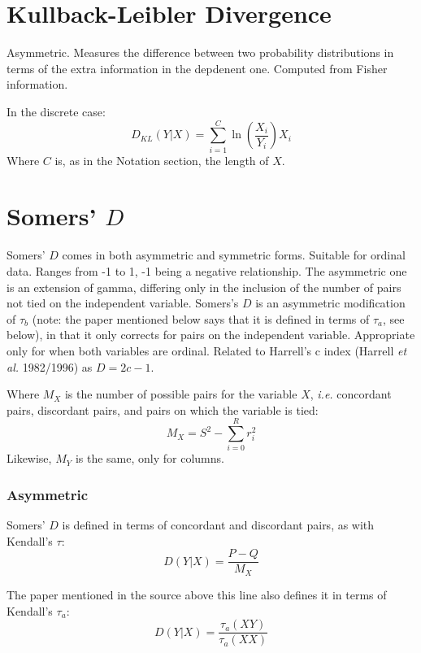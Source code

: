 \documentclass[11pt]{article}
\begin{document}
\section{Kullback-Leibler Divergence}
Asymmetric.  Measures the difference between two probability distributions in terms of the extra information in the depdenent one.  Computed from Fisher information.  

In the discrete case:
$$
D_{KL}(Y|X) = \sum_{i=1}^{C}{ \ln \left( \frac{X_i}{Y_i} \right) } X_i
$$
Where $C$ is, as in the Notation section, the length of $X$.



\section{Somers' $D$}
Somers' $D$ comes in both asymmetric and symmetric forms.  Suitable for ordinal data.  Ranges from -1 to 1, -1 being a negative relationship.  The asymmetric one is an extension of gamma, differing only in the inclusion of the number of pairs not tied on the independent variable.  Somers's $D$ is an asymmetric modification of $\tau_b$ (note: the paper mentioned below says that it is defined in terms of $\tau_a$, see below), in that it only corrects for pairs on the independent variable.  Appropriate only for when both variables are ordinal.  Related to Harrell's c index (Harrell \textsl{et al.} 1982/1996) as $D = 2c - 1$.




Where $M_X$ is the number of possible pairs for the variable $X$, \textsl{i.e.} concordant pairs, discordant pairs, and pairs on which the variable is tied:
$$
M_X = S^2 - \sum_{i=0}^{R}{r_i^2}
$$
Likewise, $M_Y$ is the same, only for columns.


\subsubsection{Asymmetric}
Somers' $D$ is defined in terms of concordant and discordant pairs, as with Kendall's $\tau$:
$$
D(Y|X) = \frac{ P - Q }{ M_X }
$$


The paper mentioned in the source above this line also defines it in terms of Kendall's $\tau_a$:
$$
D(Y|X) = \frac{ \tau_a(XY) }{  \tau_a(XX) }
$$
\end{document}
